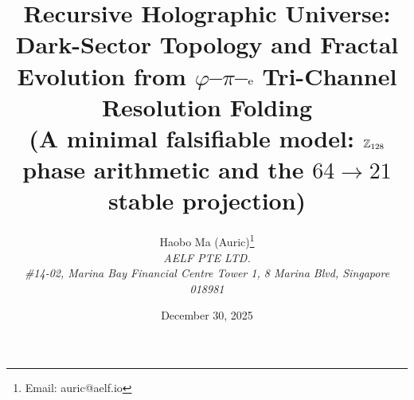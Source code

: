 \documentclass[11pt,a4paper]{article}
\title{Recursive Holographic Universe:\\
Dark-Sector Topology and Fractal Evolution from \texorpdfstring{$\varphi$--$\pi$--$\mathrm{e}$}{phi--pi--e} Tri-Channel Resolution Folding\\
\large (A minimal falsifiable model: \texorpdfstring{$\mathbb{Z}_{128}$}{Z128} phase arithmetic and the \texorpdfstring{$64\to 21$}{64->21} stable projection)}
\author{Haobo Ma (Auric)\thanks{Email: auric@aelf.io} \\
\textit{AELF PTE LTD.} \\
\textit{\#14-02, Marina Bay Financial Centre Tower 1, 8 Marina Blvd, Singapore 018981}}
\date{December 30, 2025}
\begin{document}
\maketitle














\FloatBarrier
\appendix


\FloatBarrier

\end{document}
